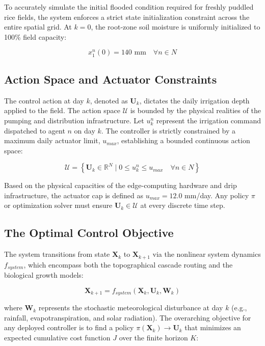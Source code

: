 \documentclass[11pt, a4paper]{article}
\begin{document}
To accurately simulate the initial flooded condition required for freshly puddled rice fields, the system enforces a strict state initialization constraint across the entire spatial grid. At $k = 0$, the root-zone soil moisture is uniformly initialized to 100\% field capacity:

\begin{equation}
    x_1^n(0) = 140 \text{ mm} \quad \forall n \in N
\end{equation}

\subsection{Action Space and Actuator Constraints}

The control action at day $k$, denoted as $\mathbf{U}_k$, dictates the daily irrigation depth applied to the field. The action space $\mathcal{U}$ is bounded by the physical realities of the pumping and distribution infrastructure. Let $u^n_k$ represent the irrigation command dispatched to agent $n$ on day $k$. The controller is strictly constrained by a maximum daily actuator limit, $u_{max}$, establishing a bounded continuous action space:

\begin{equation}
    \mathcal{U} = \left\{ \mathbf{U}_k \in \mathbb{R}^N \mid 0 \le u^n_k \le u_{max} \quad \forall n \in N \right\}
\end{equation}

Based on the physical capacities of the edge-computing hardware and drip infrastructure, the actuator cap is defined as $u_{max} = 12.0$ mm/day. Any policy $\pi$ or optimization solver must ensure $\mathbf{U}_k \in \mathcal{U}$ at every discrete time step.

\subsection{The Optimal Control Objective}

The system transitions from state $\mathbf{X}_k$ to $\mathbf{X}_{k+1}$ via the nonlinear system dynamics $f_{system}$, which encompass both the topographical cascade routing and the biological growth models:

\begin{equation}
    \mathbf{X}_{k+1} = f_{system}(\mathbf{X}_k, \mathbf{U}_k, \mathbf{W}_k)
\end{equation}

where $\mathbf{W}_k$ represents the stochastic meteorological disturbance at day $k$ (e.g., rainfall, evapotranspiration, and solar radiation). The overarching objective for any deployed controller is to find a policy $\pi(\mathbf{X}_k) \to \mathbf{U}_k$ that minimizes an expected cumulative cost function $J$ over the finite horizon $K$:
\end{document}
